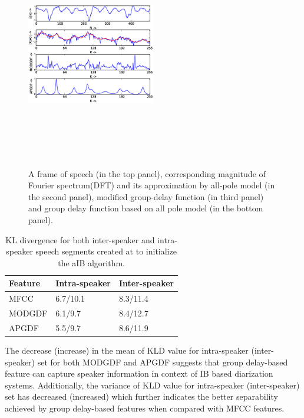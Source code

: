 \documentclass[conference]{IEEEtran}
\begin{document}
\begin{figure}[h]
\centering
\includegraphics[width=0.5\textwidth,height=10cm]{figures/apSpectrum.eps}
\caption{ A frame of speech (in the top panel), corresponding magnitude of
Fourier spectrum(DFT) and its approximation by all-pole model (in the second
panel), modified group-delay function (in third panel) and group delay function 
based on all pole model (in the bottom panel).}
\label{fig:all-pole}
\end{figure}


\begin{table}[h]
\centering

\label{table:kl-div}
\begin{tabular}{|l|l|l|}
\hline
Feature 			& Intra-speaker 			& Inter-speaker 	 \\ \hline
MFCC          			& 6.7/10.1               & 8.3/11.4       \\ \hline
MODGDF        			& 6.1/9.7                & 8.4/12.7       \\ \hline
APGDF         			& 5.5/9.7                & 8.6/11.9        \\ \hline
\end{tabular}

\vspace{0.4cm}
\caption{KL divergence for both inter-speaker and intra-speaker speech segments
created at to initialize the aIB algorithm.}
\end{table}

The decrease (increase) in the mean of KLD value for intra-speaker
(inter-speaker) set for both MODGDF and APGDF suggests that group delay-based
feature can capture speaker information in context of IB based diarization
systems. Additionally, the variance of KLD value for intra-speaker
(inter-speaker) set has decreased (increased) which further indicates the better
separability achieved by group delay-based features when compared with MFCC
features. 
\end{document}
